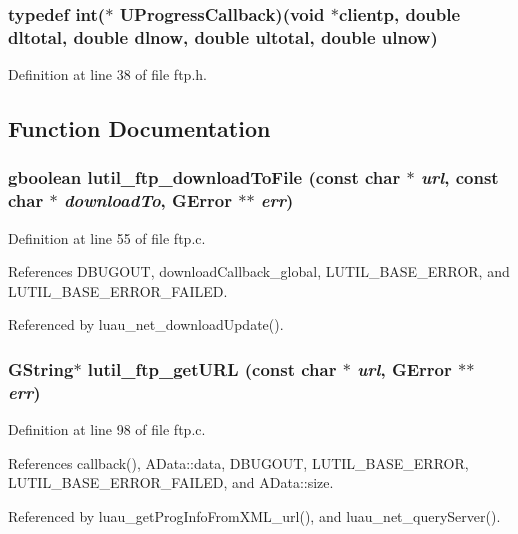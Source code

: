 \subsubsection{\setlength{\rightskip}{0pt plus 5cm}typedef int($\ast$ {\bf UProgress\-Callback})(void $\ast$clientp, double dltotal, double dlnow, double ultotal, double ulnow)}\label{ftp_8h_a0}




Definition at line 38 of file ftp.h.

\subsection{Function Documentation}
\subsubsection{\setlength{\rightskip}{0pt plus 5cm}gboolean lutil\_\-ftp\_\-download\-To\-File (const char $\ast$ {\em url}, const char $\ast$ {\em download\-To}, GError $\ast$$\ast$ {\em err})}\label{ftp_8h_a1}




Definition at line 55 of file ftp.c.

References DBUGOUT, download\-Callback\_\-global, LUTIL\_\-BASE\_\-ERROR, and LUTIL\_\-BASE\_\-ERROR\_\-FAILED.

Referenced by luau\_\-net\_\-download\-Update().
\subsubsection{\setlength{\rightskip}{0pt plus 5cm}GString$\ast$ lutil\_\-ftp\_\-get\-URL (const char $\ast$ {\em url}, GError $\ast$$\ast$ {\em err})}\label{ftp_8h_a2}




Definition at line 98 of file ftp.c.

References callback(), AData::data, DBUGOUT, LUTIL\_\-BASE\_\-ERROR, LUTIL\_\-BASE\_\-ERROR\_\-FAILED, and AData::size.

Referenced by luau\_\-get\-Prog\-Info\-From\-XML\_\-url(), and luau\_\-net\_\-query\-Server().
